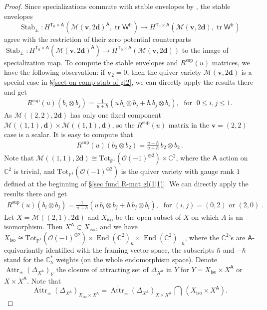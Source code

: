 \documentclass[10pt]{amsart}
\theoremstyle{definition}
\numberwithin{equation}{section}
\newcommand{\bC}{\mathbb{C}}
\newcommand{\bP}{\mathbb{P}}
\newcommand{\bv}{\mathbf{v}}
\newcommand{\bd}{\mathbf{d}}
\newcommand{\cM}{\mathcal{M}}
\newcommand{\sA}{\mathsf{A}}
\newcommand{\sT}{\mathsf{T}}
\newcommand{\sW}{\mathsf{W}}
\newcommand{\Attr}{\operatorname{Attr}}
\newcommand{\End}{\operatorname{End}}
\newcommand{\Stab}{\operatorname{Stab}}
\newcommand{\tr}{\operatorname{tr}}
\begin{document}
\begin{proof}
Since specializations commute with stable envelopes by \cite[Prop.~7.18]{COZZ}, the stable envelopes 
$$\Stab_{\pm}\colon H^{\sT_0\times \sA}(\cM(\bv,2\bd)^{\sA},\tr\sW^{\mathrm{fr}})\to H^{\sT_0\times \sA}(\cM(\bv,2\bd),\tr\sW^{\mathrm{fr}})$$ agree with the restriction of their zero potential counterparts $\Stab_{\pm}\colon H^{\sT_0\times \sA}(\cM(\bv,2\bd)^{\sA})\to H^{\sT_0\times \sA}(\cM(\bv,2\bd))$ to the image of specialization map. To compute the stable envelopes and $R^{\mathrm{sup}}(u)$ matrices, we have the following observation: if $\bv_2=0$, then the quiver variety $\cM(\bv,2\bd)$ is a special case in \S \ref{sect on comp stab of gl2}, we can directly apply the results there and get
\begin{align*}
R^{\mathrm{sup}}(u)(b_i\otimes b_j)=\frac{1}{u+\hbar}\left(u\,b_i\otimes b_j+\hbar \,b_j\otimes b_i \right),\;\text{ for }\; 0\leqslant i,j\leqslant 1.
\end{align*}
As $\cM((2,2),2\bd)$ has only one fixed component $\cM((1,1),\bd)\times \cM((1,1),\bd)$, so the $R^{\mathrm{sup}}(u)$ matrix in the $\bv=(2,2)$ case is a scalar. It is easy to compute that
\begin{align*}
R^{\mathrm{sup}}(u)(b_2\otimes b_2)=\frac{u-\hbar}{u+\hbar}\, b_2\otimes b_2\,.
\end{align*}
Note that $\cM((1,1),2\bd)\cong \mathrm{Tot}_{\bP^1}(\mathcal O(-1)^{\oplus 2})\times \bC^2$, where the $\sA$ action on $\bC^2$ is trivial, and $\mathrm{Tot}_{\bP^1}(\mathcal O(-1)^{\oplus 2})$ is the quiver variety with gauge rank $1$ defined at the beginning of \S \ref{sec fund R-mat gl(1|1)}. We can directly apply the results there and get
\begin{align*}
R^{\mathrm{sup}}(u)(b_i\otimes b_j)=\frac{1}{u+\hbar}\left(u\,b_i\otimes b_j+\hbar \,b_j\otimes b_i \right),\;\text{ for $(i,j)=(0,2)$ or $(2,0)$}\; .
\end{align*}
Let $X=\cM((2,1),2\bd)$ and $X_{\mathrm{iso}}$ be the open subset of $X$ on which $A$ is an isomorphism. Then $X^\sA\subset X_{\mathrm{iso}}$, and we have $X_{\mathrm{iso}}\cong \mathrm{Tot}_{\bP^1}(\mathcal O(-1)^{\oplus 2})\times \End(\bC^2)_\hbar\times \End(\bC^2)_{-\hbar}$, where the $\bC^2$'s are $\sA$-equivariantly identified with the framing vector space, the subscripts $\hbar$ and $-\hbar$ stand for the $\bC^*_\hbar$ weights (on the whole endomorphism space). Denote $\overline{\Attr}_{\pm}(\Delta_{X^\sA})_{Y}$ the closure of attracting set of $\Delta_{X^\sA}$ in $Y$ for $Y=X_{\mathrm{iso}}\times X^\sA$ or $X\times X^\sA$. Note that $$\overline{\Attr}_{\pm}(\Delta_{X^\sA})_{X_{\mathrm{iso}}\times X^\sA}=\overline{\Attr}_{\pm}(\Delta_{X^\sA})_{X\times X^\sA}\,\bigcap\, (X_{\mathrm{iso}}\times X^\sA).$$

\end{proof}
\end{document}
